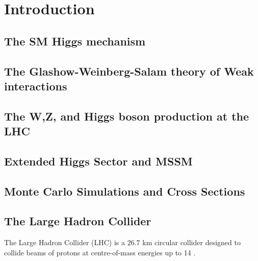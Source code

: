 \chapter{Introduction}

\section{The SM Higgs mechanism}

\section{The Glashow-Weinberg-Salam theory of Weak interactions}

\section{The W,Z, and Higgs boson production at the LHC}

\section{Extended Higgs Sector and MSSM}

\section{Monte Carlo Simulations and Cross Sections}
    
\section{The Large Hadron Collider}
The Large Hadron Collider (LHC)\cite{1748-0221-3-08-S08001} is a $26.7$ km circular collider designed to collide beams of protons at centre-of-mass energies up to 14 \TeV. 




